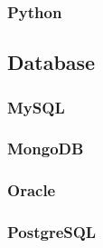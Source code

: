 \subsubsection{Python}



\subsection{Database}

\subsubsection{MySQL}



\subsubsection{MongoDB}



\subsubsection{Oracle}



\subsubsection{PostgreSQL}


